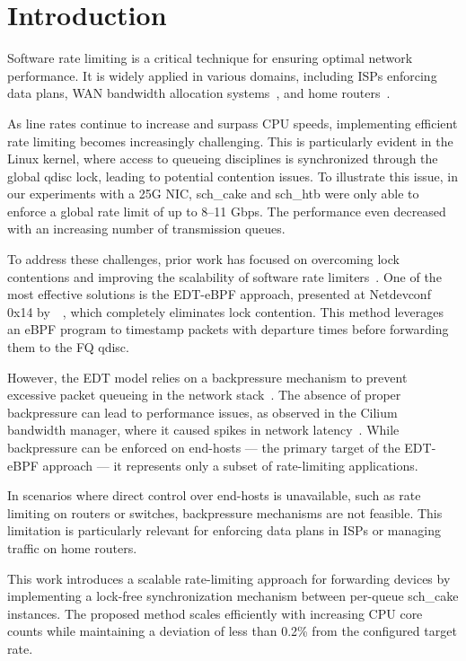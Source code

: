 \section{Introduction}

Software rate limiting is a critical technique for ensuring optimal network performance. It is widely applied in various domains, including ISPs enforcing data plans, WAN bandwidth allocation systems~\cite{bwe}, and home routers~\cite{cake}.

As line rates continue to increase and surpass CPU speeds, implementing efficient rate limiting becomes increasingly challenging. This is particularly evident in the Linux kernel, where access to queueing disciplines is synchronized through the global qdisc lock, leading to potential contention issues.
To illustrate this issue, in our experiments with a 25G NIC, sch\_cake and sch\_htb were only able to enforce a global rate limit of up to 8--11 Gbps. The performance even decreased with an increasing number of transmission queues.

To address these challenges, prior work has focused on overcoming lock contentions and improving the scalability of software rate limiters~\cite{eyeq, carousel, edt-ebpf}. One of the most effective solutions is the EDT-eBPF approach, presented at Netdevconf 0x14 by~\citeauthor{edt-ebpf}~\cite{edt-ebpf}, which completely eliminates lock contention. This method leverages an eBPF program to timestamp packets with departure times before forwarding them to the FQ qdisc.

However, the EDT model relies on a backpressure mechanism to prevent excessive packet queueing in the network stack~\cite{carousel}. The absence of proper backpressure can lead to performance issues, as observed in the Cilium bandwidth manager, where it caused spikes in network latency~\cite{edt-issue, fifo-in-the-cloud}. While backpressure can be enforced on end-hosts --- the primary target of the EDT-eBPF approach --- it represents only a subset of rate-limiting applications.

In scenarios where direct control over end-hosts is unavailable, such as rate limiting on routers or switches, backpressure mechanisms are not feasible. This limitation is particularly relevant for enforcing data plans in ISPs or managing traffic on home routers.

This work introduces a scalable rate-limiting approach for forwarding devices by implementing a lock-free synchronization mechanism between per-queue sch\_cake instances. The proposed method scales efficiently with increasing CPU core counts while maintaining a deviation of less than 0.2\% from the configured target rate.